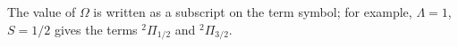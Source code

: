 The value of $\Omega$ is written as a subscript on the term symbol; for example, $\Lambda=1$, $S=1/2$ gives the terms ${}^2\Pi_{1/2}$ and ${}^2\Pi_{3/2}$.
